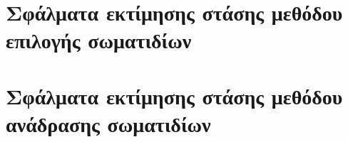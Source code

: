 \section{Σφάλματα εκτίμησης στάσης μεθόδου επιλογής σωματιδίων}
  \label{appendix:02:selection_methods}
  

\section{Σφάλματα εκτίμησης στάσης μεθόδου ανάδρασης σωματιδίων}
  \label{appendix:02:feedback_methods}
  
